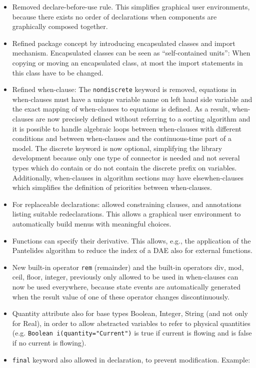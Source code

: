 \begin{itemize}
\item
  Removed declare-before-use rule. This simplifies graphical user
  environments, because there exists no order of declarations when
  components are graphically composed together.
\item
  Refined package concept by introducing encapsulated classes and import
  mechanism. Encapsulated classes can be seen as ``self-contained units'':
  When copying or moving an encapsulated class, at most the import
  statements in this class have to be changed.
\item
  Refined when-clause: The \lstinline!nondiscrete! keyword is removed, equations in
  when-clauses must have a unique variable name on left hand side
  variable and the exact mapping of when-clauses to equations is
  defined. As a result, when-clauses are now precisely defined without
  referring to a sorting algorithm and it is possible to handle
  algebraic loops between when-clauses with different conditions and
  between when-clauses and the continuous-time part of a model. The
  discrete keyword is now optional, simplifying the library development
  because only one type of connector is needed and not several types
  which do contain or do not contain the discrete prefix on variables.
  Additionally, when-clauses in algorithm sections may have
  elsewhen-clauses which simplifies the definition of priorities between
  when-clauses.
\item
  For replaceable declarations: allowed constraining clauses, and
  annotations listing suitable redeclarations. This allows a graphical
  user environment to automatically build menus with meaningful choices.
\item
  Functions can specify their derivative. This allows, e.g., the
  application of the Pantelides algorithm to reduce the index of a DAE
  also for external functions.
\item
  New built-in operator \lstinline!rem! (remainder) and the built-in operators
  div, mod, ceil, floor, integer, previously only allowed to be used in
  when-clauses can now be used everywhere, because state events are
  automatically generated when the result value of one of these operator
  changes discontinuously.
\item
  Quantity attribute also for base types Boolean, Integer, String (and
  not only for Real), in order to allow abstracted variables to refer to
  physical quantities (e.g. \lstinline!Boolean i(quantity="Current")! is true if
  current is flowing and is false if no current is flowing).
\item
  \lstinline!final! keyword also allowed in declaration, to prevent modification.
  Example:
\end{itemize}

